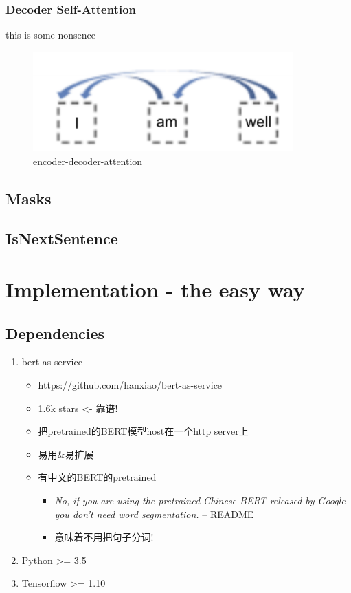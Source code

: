 \documentclass[]{article}
\numberwithin{equation}{subsection}
\begin{document}
	\subsubsection{Decoder Self-Attention}
		this is some nonsence
	\begin{figure}[!htb]
		\centering
		\includegraphics[width=10cm]{./assets/decoder-self-attention.png}
		\caption{encoder-decoder-attention}
		\label{fid:decoder-self-attention}
	\end{figure}
	\subsection{Masks}
	\subsection{IsNextSentence}
	
	\section{Implementation - the easy way}
	\subsection{Dependencies}
	\begin{enumerate}
		\item bert-as-service
			\begin{itemize}
				\item https://github.com/hanxiao/bert-as-service
				\item 1.6k stars <- 靠谱!
				\item 把pretrained的BERT模型host在一个http server上
				\item 易用\&易扩展
				\item 有中文的BERT的pretrained
					\begin{itemize}
						\item \textit{No, if you are using the pretrained Chinese BERT released by Google you don't need word segmentation. } -- README
						\item 意味着不用把句子分词!
					\end{itemize}
			\end{itemize}
		\item Python >= 3.5
		\item Tensorflow >= 1.10 
	\end{enumerate}
\end{document}
